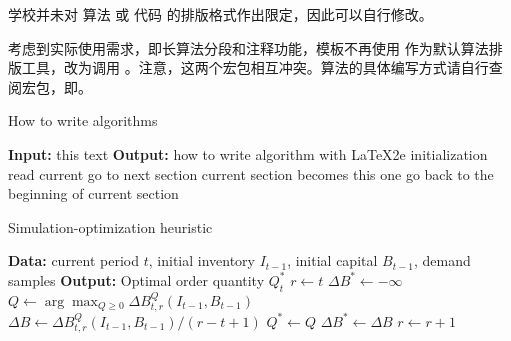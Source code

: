

\begin{tcolorbox}[colback=red!5!white,colframe=red!75!black]
  学校并未对 算法 或 代码 的排版格式作出限定，因此可以自行修改。
\end{tcolorbox}


考虑到实际使用需求，即长算法分段和注释功能，模板不再使用  作为默认算法排版工具，改为调用 。注意，这两个宏包相互冲突。算法的具体编写方式请自行查阅宏包，即。

\begin{texcode}[]{}
\begin{algorithm}[H]
  \caption{How to write algorithms}
  \begin{algorithmic}[1]
      \State \textbf{Input:} this text
      \State \textbf{Output:} how to write algorithm with \LaTeX2e 
      \State initialization
        \State read current
          \State go to next section
          \State current section becomes this one
          \State go back to the beginning of current section
        \EndIf
      \EndWhile
  \end{algorithmic}
\end{algorithm}
\end{texcode}

\begin{texcode}[]{}
  \begin{algorithm}[H]
    \caption{Simulation-optimization heuristic}\label{algorithm:SOH}
    \begin{algorithmic}[1]
        \State \textbf{Data:} current period $t$, initial inventory $I_{t-1}$, initial capital $B_{t-1}$, demand samples
        \State \textbf{Output:} Optimal order quantity $Q^{\ast}_{t}$
        \State $r\leftarrow t$
        \State $\Delta B^{\ast}\leftarrow -\infty$
          \State $Q\leftarrow\arg\max_{Q\geq 0}\Delta B^{Q}_{t,r}(I_{t-1},B_{t-1})$
          \State $\Delta B\leftarrow \Delta B^{Q}_{t,r}(I_{t-1},B_{t-1})/(r-t+1)$
            \State $Q^{\ast}\leftarrow Q$
            \State $\Delta B^{\ast}\leftarrow \Delta B$
          \EndIf
          \State $r\leftarrow r+1$
        \EndWhile
    \end{algorithmic}
  \end{algorithm}
\end{texcode}



